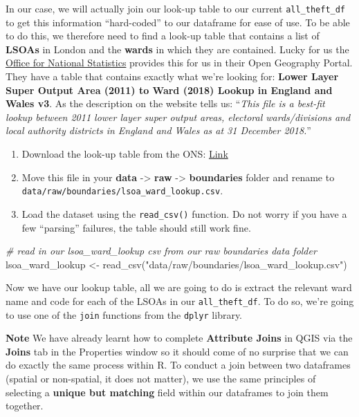 \documentclass[
]{book}
\newenvironment{Shaded}{\begin{snugshade}}{\end{snugshade}}
\newcommand{\CommentTok}[1]{\textcolor[rgb]{0.56,0.35,0.01}{\textit{#1}}}
\newcommand{\FunctionTok}[1]{\textcolor[rgb]{0.00,0.00,0.00}{#1}}
\newcommand{\NormalTok}[1]{#1}
\newcommand{\OtherTok}[1]{\textcolor[rgb]{0.56,0.35,0.01}{#1}}
\newcommand{\StringTok}[1]{\textcolor[rgb]{0.31,0.60,0.02}{#1}}
\providecommand{\tightlist}{%
  \setlength{\itemsep}{0pt}\setlength{\parskip}{0pt}}
\begin{document}
In our case, we will actually join our look-up table to our current \texttt{all\_theft\_df} to get this information ``hard-coded'' to our dataframe for ease of use. To be able to do this, we therefore need to find a look-up table that contains a list of \textbf{LSOAs} in London and the \textbf{wards} in which they are contained. Lucky for us the \href{https://www.ons.gov.uk/}{Office for National Statistics} provides this for us in their Open Geography Portal. They have a table that contains exactly what we're looking for: \textbf{Lower Layer Super Output Area (2011) to Ward (2018) Lookup in England and Wales v3}. As the description on the website tells us: ``\emph{This file is a best-fit lookup between 2011 lower layer super output areas, electoral wards/divisions and local authority districts in England and Wales as at 31 December 2018.}''

\begin{enumerate}
\def\labelenumi{\arabic{enumi}.}
\tightlist
\item
  Download the look-up table from the ONS: \href{https://geoportal.statistics.gov.uk/datasets/8c05b84af48f4d25a2be35f1d984b883_0}{Link}
\item
  Move this file in your \textbf{data} -\textgreater{} \textbf{raw} -\textgreater{} \textbf{boundaries} folder and rename to \texttt{data/raw/boundaries/lsoa\_ward\_lookup.csv}.
\item
  Load the dataset using the \texttt{read\_csv()} function. Do not worry if you have a few ``parsing'' failures, the table should still work fine.
\end{enumerate}

\begin{Shaded}
\begin{Highlighting}[]
\CommentTok{\# read in our lsoa\_ward\_lookup csv from our raw boundaries data folder}
\NormalTok{lsoa\_ward\_lookup }\OtherTok{\textless{}{-}} \FunctionTok{read\_csv}\NormalTok{(}\StringTok{"data/raw/boundaries/lsoa\_ward\_lookup.csv"}\NormalTok{)}
\end{Highlighting}
\end{Shaded}

Now we have our lookup table, all we are going to do is extract the relevant ward name and code for each of the LSOAs in our \texttt{all\_theft\_df}. To do so, we're going to use one of the \texttt{join} functions from the \texttt{dplyr} library.

\textbf{Note}
We have already learnt how to complete \textbf{Attribute Joins} in QGIS via the \textbf{Joins} tab in the Properties window so it should come of no surprise that we can do exactly the same process within R. To conduct a join between two dataframes (spatial or non-spatial, it does not matter), we use the same principles of selecting a \textbf{unique but matching} field within our dataframes to join them together.
\end{document}
